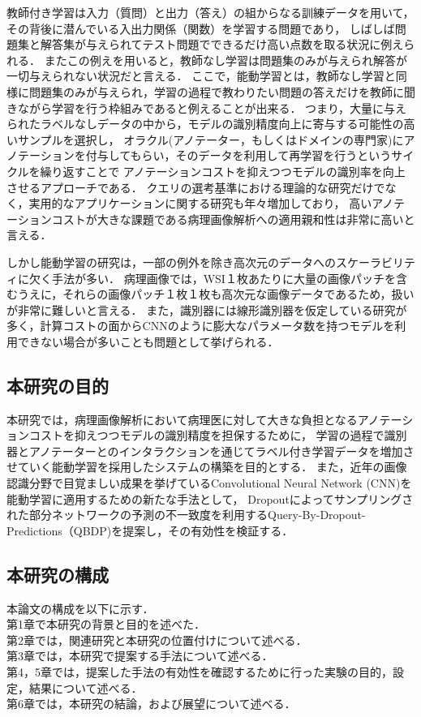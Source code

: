 教師付き学習は入力（質問）と出力（答え）の組からなる訓練データを用いて， その背後に潜んでいる入出力関係（関数）を学習する問題であり，
しばしば問題集と解答集が与えられてテスト問題でできるだけ高い点数を取る状況に例えられる．
またこの例えを用いると，教師なし学習は問題集のみが与えられ解答が一切与えられない状況だと言える．
ここで，能動学習とは，教師なし学習と同様に問題集のみが与えられ，学習の過程で教わりたい問題の答えだけを教師に聞きながら学習を行う枠組みであると例えることが出来る．
つまり，大量に与えられたラベルなしデータの中から，モデルの識別精度向上に寄与する可能性の高いサンプルを選択し，
オラクル(アノテーター，もしくはドメインの専門家)にアノテーションを付与してもらい，そのデータを利用して再学習を行うというサイクルを繰り返すことで
アノテーションコストを抑えつつモデルの識別率を向上させるアプローチである．
クエリの選考基準における理論的な研究だけでなく，実用的なアプリケーションに関する研究も年々増加しており，
高いアノテーションコストが大きな課題である病理画像解析への適用親和性は非常に高いと言える．

しかし能動学習の研究は，一部の例外を除き高次元のデータへのスケーラビリティに欠く手法が多い．
病理画像では，WSI１枚あたりに大量の画像パッチを含むうえに，それらの画像パッチ１枚１枚も高次元な画像データであるため，扱いが非常に難しいと言える．
また，識別器には線形識別器を仮定している研究が多く，計算コストの面からCNNのように膨大なパラメータ数を持つモデルを利用できない場合が多いことも問題として挙げられる．

\subsection{本研究の目的}
本研究では，病理画像解析において病理医に対して大きな負担となるアノテーションコストを抑えつつモデルの識別精度を担保するために，
学習の過程で識別器とアノテーターとのインタラクションを通じてラベル付き学習データを増加させていく能動学習を採用したシステムの構築を目的とする．
また，近年の画像認識分野で目覚ましい成果を挙げているConvolutional Neural Network (CNN)を能動学習に適用するための新たな手法として，
Dropoutによってサンプリングされた部分ネットワークの予測の不一致度を利用するQuery-By-Dropout-Predictions（QBDP)を提案し，その有効性を検証する．


\subsection{本研究の構成}
本論文の構成を以下に示す．\\
第1章で本研究の背景と目的を述べた． \\
第2章では，関連研究と本研究の位置付けについて述べる．\\
第3章では，本研究で提案する手法について述べる．\\
第4，5章では，提案した手法の有効性を確認するために行った実験の目的，設定，結果について述べる．\\
第6章では，本研究の結論，および展望について述べる．


